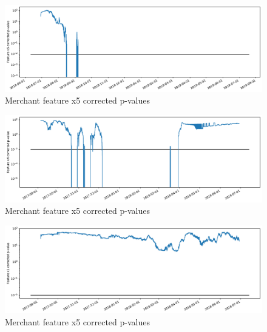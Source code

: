 \begin{figure}[!htb]
    \begin{center}
      \includegraphics[scale=0.5]{figures/merchant-x5-correctedpvalues.pdf}
      \caption{Merchant feature x5 corrected p-values}
      \label{fig:merchant-x5-correctedpvalues}
    \end{center}
\end{figure}



\begin{figure}[!htb]
    \begin{center}
      \includegraphics[scale=0.5]{figures/merchant2-x4-correctedpvalues.pdf}
      \caption{Merchant feature x5 corrected p-values}
      \label{fig:merchant2-x4-correctedpvalues}
    \end{center}
\end{figure}

\begin{figure}[!htb]
    \begin{center}
      \includegraphics[scale=0.5]{figures/merchant2-x5-correctedpvalues.pdf}
      \caption{Merchant feature x5 corrected p-values}
      \label{fig:merchant2-x5-correctedpvalues}
    \end{center}
\end{figure}